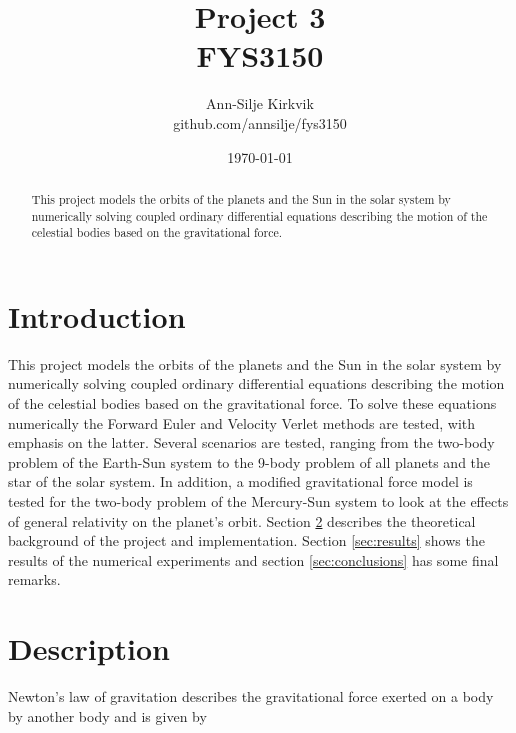\documentclass{article}
\begin{document}
\title{\vspace{1cm}Project 3 \\ FYS3150}

\author{\vspace{1cm}Ann-Silje Kirkvik \\ github.com/annsilje/fys3150}
\date{\vspace{5cm}\today}

\maketitle

\newpage

\begin{abstract}
This project models the orbits of the planets and the Sun in the solar system by numerically solving coupled ordinary differential equations describing the motion of the celestial bodies based on the gravitational force.
\end{abstract}

\vspace{1cm}


\section{Introduction}
This project models the orbits of the planets and the Sun in the solar system by numerically solving coupled ordinary differential equations describing the motion of the celestial bodies based on the gravitational force. To solve these equations numerically the Forward Euler and Velocity Verlet methods are tested, with emphasis on the latter. Several scenarios are tested, ranging from the two-body problem of the Earth-Sun system to the 9-body problem of all planets and the star of the solar system. In addition, a modified gravitational force model is tested for the two-body problem of the Mercury-Sun system to look at the effects of general relativity on the planet's orbit. Section \ref{sec:description} describes the theoretical background of the project and implementation. Section \ref{sec:results} shows the results of the numerical experiments and section \ref{sec:conclusions} has some final remarks.


\section{Description}
\label{sec:description}
Newton's law of gravitation describes the gravitational force exerted on a body by another body and is given by
\end{document}
